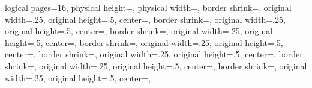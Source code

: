 %
%
%
%
%
{%
	\edef\pgfpageoptionheight{\the\paperheight}%
	\edef\pgfpageoptionwidth{\the\paperwidth}%
	\edef\pgfpageoptionborder{1pt}%
}%
{
  \pgfpagesphysicalpageoptions%
  {%
    logical pages=16,%
    physical height=\pgfpageoptionheight,%
    physical width=\pgfpageoptionwidth,%
  }%
%
%
  {%
    border shrink=\pgfpageoptionborder,%
    original width=.25\pgfpageoptionheight,%
    original height=.5\pgfpageoptionwidth,%
	center=\pgfpoint{0pt}{\pgfphysicalheight},%
  }%
  {%
    border shrink=\pgfpageoptionborder,%
    original width=.25\pgfpageoptionheight,%
    original height=.5\pgfpageoptionwidth,%
	center=\pgfpoint{.5\pgfphysicalwidth}{\pgfphysicalheight},%
  }%
  {%
  	border shrink=\pgfpageoptionborder,%
  	original width=.25\pgfpageoptionheight,%
  	original height=.5\pgfpageoptionwidth,%
	center=\pgfpoint{0pt}{.75\pgfphysicalheight},%
  }%
  {%
  	border shrink=\pgfpageoptionborder,%
	original width=.25\pgfpageoptionheight,%
	original height=.5\pgfpageoptionwidth,%
	center=\pgfpoint{.5\pgfphysicalwidth}{.75\pgfphysicalheight},%
  }%
  {%
	border shrink=\pgfpageoptionborder,%
	original width=.25\pgfpageoptionheight,%
	original height=.5\pgfpageoptionwidth,%
	center=\pgfpoint{0pt}{.5\pgfphysicalheight},%
  }%
  {%
	border shrink=\pgfpageoptionborder,%
	original width=.25\pgfpageoptionheight,%
	original height=.5\pgfpageoptionwidth,%
	center=\pgfpoint{.5\pgfphysicalwidth}{.5\pgfphysicalheight},%
  }%
  {%
	border shrink=\pgfpageoptionborder,%
	original width=.25\pgfpageoptionheight,%
	original height=.5\pgfpageoptionwidth,%
	center=\pgfpoint{0pt}{.25\pgfphysicalheight},%
  }%
}
